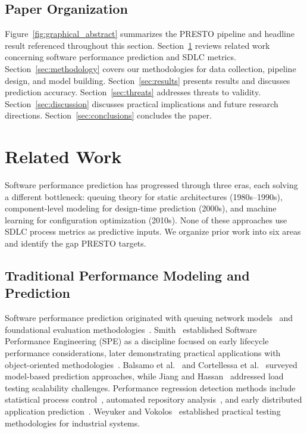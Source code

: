 \documentclass[technologies,article,submit,pdftex,moreauthors]{Definitions/mdpi}
\begin{document}
\subsection{Paper Organization}\label{sec:organization}

Figure~\ref{fig:graphical_abstract} summarizes the PRESTO pipeline and headline result referenced throughout this section.
Section~\ref{sec:related_work} reviews related work
concerning software performance prediction and SDLC metrics.
Section~\ref{sec:methodology} covers our methodologies
for data collection, pipeline design, and model building.
Section~\ref{sec:results} presents results and discusses
prediction accuracy. Section~\ref{sec:threats} addresses
threats to validity. Section~\ref{sec:discussion}
discusses practical implications and future research directions.
Section~\ref{sec:conclusions} concludes the paper.

\section{Related Work}\label{sec:related_work}

Software performance prediction has progressed through three eras, each
solving a different bottleneck: queuing theory for static architectures
(1980s--1990s), component-level modeling for design-time prediction
(2000s), and machine learning for configuration optimization (2010s).
None of these approaches use SDLC process metrics as predictive inputs.
We organize prior work into six areas and identify the gap PRESTO
targets.

\subsection{Traditional Performance Modeling and
Prediction}\label{sec:rw_traditional}

Software performance prediction originated with queuing network
models~\cite{lazowska1984, reiser1980} and foundational evaluation
methodologies~\cite{ferrari1978, sauer1981, jain1991}.
Smith~\cite{smith1990} established Software Performance Engineering
(SPE) as a discipline focused on early lifecycle performance
considerations, later demonstrating practical applications with
object-oriented methodologies~\cite{smith2002}. Balsamo et
al.~\cite{balsamo2004} and Cortellessa et al.~\cite{cortellessa2011}
surveyed model-based prediction approaches, while Jiang and
Hassan~\cite{jiang2015} addressed load testing scalability challenges.
Performance regression detection methods include statistical process
control~\cite{nguyen2012}, automated repository
analysis~\cite{foo2010}, and early distributed application
prediction~\cite{hplabs2006}. Weyuker and Vokolos~\cite{weyuker2000}
established practical testing methodologies for industrial systems.
\end{document}

